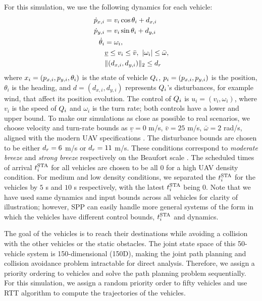 For this simulation, we use the following dynamics for each vehicle:
\begin{equation}
\label{eq:dyn_i}
\begin{aligned}
\dot{p}_{x,i} &= v_i \cos \theta_i + d_{x,i} \\
\dot{p}_{y,i} &= v_i \sin \theta_i + d_{y,i}\\
\dot{\theta}_i &= \omega_i, \\
& \underline{v} \le v_i \le \bar{v}, ~|\omega_i| \le \bar{\omega}, \\
& \|(d_{x,i}, d_{y,i}) \|_2 \le d_{r}
\end{aligned}
\end{equation}
\noindent where $x_i = (p_{x,i}, p_{y,i}, \theta_i)$ is the state of vehicle $Q_i$, $p_i = (p_{x,i}, p_{y,i})$ is the position, $\theta_i$ is the heading, and $d = (d_{x,i}, d_{y,i})$ represents $Q_i$'s disturbances, for example wind, that affect its position evolution. The control of $Q_i$ is $u_i = (v_i, \omega_i)$, where $v_i$ is the speed of $Q_i$ and $\omega_i$ is the turn rate; both controls have a lower and upper bound. To make our simulations as close as possible to real scenarios, we choose velocity and turn-rate bounds as $\underline{v} = 0$ m/s, $\bar{v} = 25$ m/s, $\bar\omega = 2$ rad/s, aligned with the modern UAV specifications \cite{UAVspecs1, UAVspecs2}. The disturbance bounds are chosen to be either $d_r = 6$ m/s or $d_r= 11$ m/s. These conditions correspond to \textit{moderate breeze} and \textit{strong breeze} respectively on the Beaufort scale \cite{Windscale}. The scheduled times of arrival $t^\text{STA}_i$ for all vehicles are chosen to be all $0$ for a high UAV density condition. For medium and low density conditions, we separated the $t^\text{STA}_i$ for the vehicles by $5$ s and $10$ s respectively, with the latest $t^\text{STA}_i$ being 0. Note that we have used same dynamics and input bounds across all vehicles for clarity of illustration; however, SPP can easily handle more general systems of the form in which the vehicles have different control bounds, $t^\text{STA}_i$ and dynamics.

The goal of the vehicles is to reach their destinations while avoiding a collision with the other vehicles or the static obstacles. The joint state space of this 50-vehicle system is 150-dimensional (150D), making the joint path planning and collision avoidance problem intractable for direct analysis. Therefore, we assign a priority ordering to vehicles and solve the path planning problem sequentially. For this simulation, we assign a random priority order to fifty vehicles and use RTT algorithm to compute the trajectories of the vehicles. 
